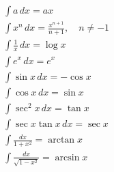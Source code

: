 \documentclass[11pt]{article}
\begin{document}
\begin{align}
  &\int{a \, dx} = ax \\
  &\int{x^{n}\, dx} = \frac{x^{n+1}}{n+1}, \quad n \neq -1 \\
  &\int{\frac{1}{x}\, dx} = \log{x} \\
  &\int{e^{x}\, dx} = e^{x} \\
  &\int{\sin x\, dx} = -\cos x \\
  &\int{\cos x\, dx} = \sin x \\
  &\int{\sec^2 x\, dx} = \tan x \\
  &\int{\sec x \tan x \, dx} = \sec x \\
  &\int{\frac{dx}{1 + x^{2}}} = \arctan x \\
  &\int{\frac{dx}{\sqrt{1 - x^{2}}}} = \arcsin x \\
\end{align}
\end{document}

